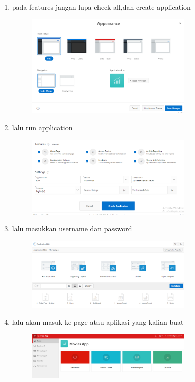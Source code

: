 \documentclass{article}
\begin{document}
\begin{enumerate}
\begin{figure}[h]
            \end{figure}
            \item pada features jangan lupa check all,dan create application
\begin{figure}[h]
\centerline{\includegraphics[width=8cm]{figure/16.png}}
            \end{figure}
            \item lalu run application
\begin{figure}[h]
\centerline{\includegraphics[width=8cm]{figure/17.png}}
            \end{figure}
           \newpage \item lalu masukkan username dan password
\begin{figure}[h]
\centerline{\includegraphics[width=8cm]{figure/18.png}}
            \end{figure}
            \item lalu akan masuk ke page atau aplikasi yang kalian buat
\begin{figure}[h]
\centerline{\includegraphics[width=8cm]{figure/20.png}}
            \end{figure}
            
\end{enumerate}
\end{document}
